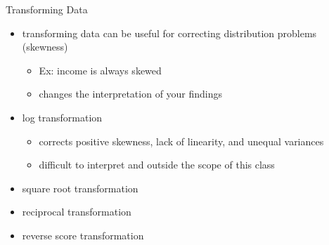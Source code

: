 \documentclass[
  ignorenonframetext,
]{beamer}
\begin{document}
\begin{frame}{Transforming Data}
\protect\hypertarget{transforming-data}{}
\begin{itemize}
\item
  transforming data can be useful for correcting distribution problems
  (skewness)

  \begin{itemize}
  \item
    Ex: income is always skewed
  \item
    changes the interpretation of your findings
  \end{itemize}
\item
  log transformation

  \begin{itemize}
  \item
    corrects positive skewness, lack of linearity, and unequal variances
  \item
    difficult to interpret and outside the scope of this class
  \end{itemize}
\item
  square root transformation
\item
  reciprocal transformation
\item
  reverse score transformation
\end{itemize}
\end{frame}
\end{document}
